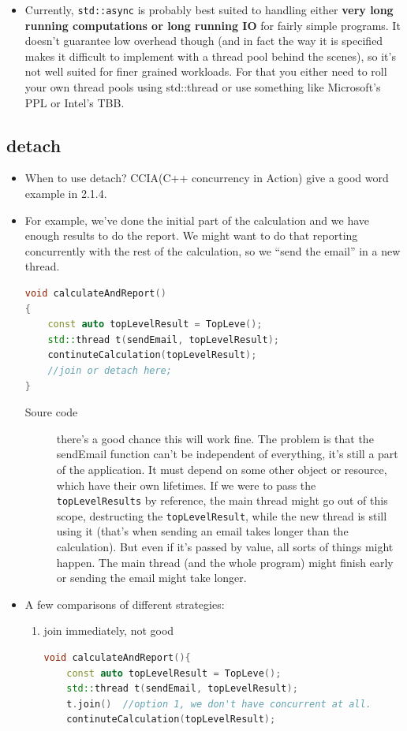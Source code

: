 \documentclass[a4paper,11pt,twoside]{book}
\begin{document}
\begin{itemize}
\item Currently, \texttt{std::async} is probably best suited to handling either \textbf{very long running computations or long running IO} for fairly simple programs. It doesn't guarantee low overhead though (and in fact the way it is specified makes it difficult to implement with a thread pool behind the scenes), so it's not well suited for finer grained workloads. For that you either need to roll your own thread pools using std::thread or use something like Microsoft's PPL or Intel's TBB. 


\end{itemize}

\subsection{detach}
\begin{itemize}
	\item When to use detach? CCIA(C++ concurrency in Action) give a good word example in 2.1.4.
	
	\item For example, we’ve done the initial part of the calculation and we have enough results to do the report. We might want to do that reporting concurrently with the rest of the calculation, so we “send the email” in a new thread.
\begin{lstlisting}[frame=single, language=c++]
void calculateAndReport()
{
	const auto topLevelResult = TopLeve();
	std::thread t(sendEmail, topLevelResult);
	continuteCalculation(topLevelResult);
	//join or detach here;
}
\end{lstlisting}	
\begin{description}
	\item[Soure code]  there’s a good chance this will work fine. The problem is that the sendEmail function can’t be independent of everything, it’s still a part of the application. It must depend on some other object or resource, which have their own lifetimes. If we were to pass the \texttt{topLevelResults} by reference, the main thread might go out of this scope, destructing the \texttt{topLevelResult}, while the new thread is still using it (that’s when sending an email takes longer than the calculation). But even if it’s passed by value, all sorts of things might happen. The main thread (and the whole program) might finish early or sending the email might take longer.
\end{description}

	\item A few comparisons of different strategies:
	\begin{enumerate}
		\item join immediately, not good
\begin{lstlisting}[frame=single, language=c++]
void calculateAndReport(){
	const auto topLevelResult = TopLeve();
	std::thread t(sendEmail, topLevelResult);
	t.join()  //option 1, we don't have concurrent at all. 
	continuteCalculation(topLevelResult);
	

\end{lstlisting}
\end{enumerate}
\end{itemize}
\end{document}
